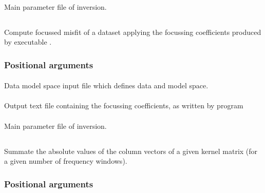 \paragraph{}
Main parameter file of inversion. 
%
%
\subsection{} \label{programs_scripts,sec:bin_prog,sec:comp_focus_misfit}
Compute focussed misfit of a dataset applying the focussing coefficients produced by executable 
.

\subsubsection{Positional arguments}
\paragraph{}
Data model space input file which defines data and model space.
\paragraph{}
Output text file containing the focussing coefficients, as written by program 
\paragraph{}
Main parameter file of inversion.
%
%
\subsection{} \label{programs_scripts,sec:bin_prog,sec:compute_kernel_coverage}
Summate the absolute values of the column vectors of a given kernel matrix (for a given number  of 
frequency windows).
\subsubsection{Positional arguments}
